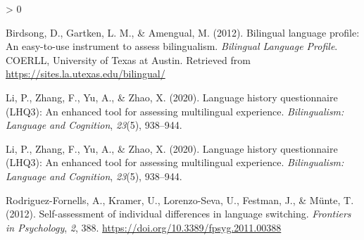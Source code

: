 \documentclass[
  english,
  man,floatsintext]{apa6}
\newlength{\cslhangindent}
\newenvironment{CSLReferences}[2] %
 {%
  \setlength{\parindent}{0pt}
  \ifodd #1 \everypar{\setlength{\hangindent}{\cslhangindent}}\ignorespaces\fi
  \ifnum #2 > 0
  \setlength{\parskip}{#2\baselineskip}
  \fi
 }%
 {}
\begin{document}
\begingroup
\setlength{\parindent}{-0.5in}
\setlength{\leftskip}{0.5in}

\hypertarget{refs}{}
\begin{CSLReferences}{1}{0}
\leavevmode\hypertarget{ref-bir2012}{}%
Birdsong, D., Gartken, L. M., \& Amengual, M. (2012). Bilingual language profile: An easy-to-use instrument to assess bilingualism. \emph{Bilingual Language Profile}. COERLL, University of Texas at Austin. Retrieved from \url{https://sites.la.utexas.edu/bilingual/}

\leavevmode\hypertarget{ref-li2020}{}%
Li, P., Zhang, F., Yu, A., \& Zhao, X. (2020). Language history questionnaire (LHQ3): An enhanced tool for assessing multilingual experience. \emph{Bilingualism: Language and Cognition}, \emph{23}(5), 938--944.

\leavevmode\hypertarget{ref-li2020}{}%
Li, P., Zhang, F., Yu, A., \& Zhao, X. (2020). Language history questionnaire (LHQ3): An enhanced tool for assessing multilingual experience. \emph{Bilingualism: Language and Cognition}, \emph{23}(5), 938--944.

\leavevmode\hypertarget{ref-rod2012}{}%
Rodriguez-Fornells, A., Kramer, U., Lorenzo-Seva, U., Festman, J., \& Münte, T. (2012). Self-assessment of individual differences in language switching. \emph{Frontiers in Psychology}, \emph{2}, 388. \url{https://doi.org/10.3389/fpsyg.2011.00388}

\end{CSLReferences}

\endgroup
\end{document}

